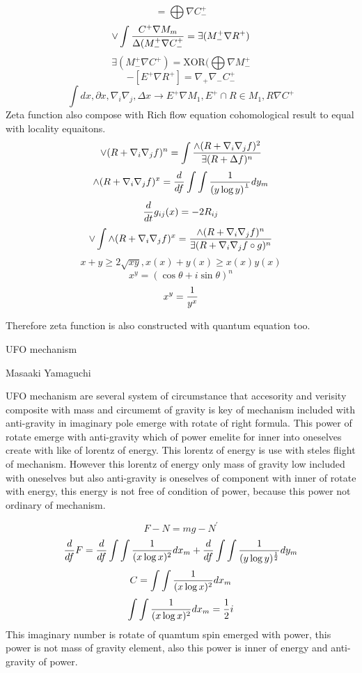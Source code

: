 \documentclass{jsarticle}
\begin{document}
{$$ = \bigoplus \nabla C^{+}_{-} $$
$$ \vee \int {C^{+} \nabla M_m \over \Delta(M^{+}_{-} \nabla C^{+}_{-}} = \exists(M^{+}_{-} \nabla R^{+}) $$
$$ \exists(M^{+}_{-} \nabla C^{+}) = \mathrm{XOR}(\bigoplus \nabla M^{+}_{-} $$
$$ -[E^{+} \nabla R^{+}] = \nabla_{+} \nabla_{-} C^{+}_{-}$$ $$ \int dx, \partial x, \nabla_i \nabla_j , \Delta x \to
 E^{+} \nabla M_1, E^{+} \cap R \in M_1, R \nabla C^{+} $$
 Zeta function also compose with Rich flow equation cohomological result to equal with locality equaitons.
$$ \vee(R + \nabla_i \nabla_j f)^n = \int {\wedge(R + \nabla_i \nabla_j f)^2 \over \exists(R + \Delta f)^n} $$
$$ \wedge(R + \nabla_i \nabla_j f)^x = {d \over df}\int \int {1 \over (y \log y)^{1 \over }}dy_m $$
$$ {d \over dt}g_{ij}(x) = - 2 R_{ij} $$
$$ \vee \int  \wedge(R + \nabla_i \nabla_j f)^x = {\wedge(R + \nabla_i \nabla_j f)^n \over 
\exists(R + \nabla_i \nabla_j f \circ g)^n}$$
$$ x + y \ge 2\sqrt{xy}, x(x) + y(x) \ge x(x)y(x) $$
$$ x^y = (\cos \theta + i \sin \theta)^n $$
$$ x^y = {1 \over y^x} $$

 Therefore zeta function is also constructed with quantum equation too.














\newpage
\begin{center}
\large	UFO mechanism
\end{center}
\begin{center}
	Masaaki Yamaguchi
\end{center}

   UFO mechanism are several system of circumstance that accesority and verisity composite with
mass and circumemt of gravity is key of mechanism included with anti-gravity in imaginary pole 
emerge with rotate of right formula. This power of rotate emerge with anti-gravity which of power
emelite for inner into oneselves create with like of lorentz of energy.
This lorentz of energy is use with steles flight of mechanism.
However this lorentz of energy only mass of gravity low included with oneselves
but also anti-gravity is oneselves of component with inner of rotate with energy,
this energy is not free of condition of power, because this power not ordinary of mechanism. 

  $$ F - N = mg - N^{'} $$
  $$ {d \over df}F = {d \over df}\int \int {1 \over (x \log x)^2}dx_m + {d \over df}\int \int {1 \over 
  (y \log y)^{1 \over 2}}dy_m $$
  $$ C = \int \int {1 \over (x \log x)^2}dx_m $$
  $$ \int \int {1 \over (x \log x)^2}dx_m = {1 \over 2}i $$
  This imaginary number is rotate of quamtum spin emerged with power, this power is not mass of gravity element, 
also this power is inner of energy and anti-gravity of power. 


}
\end{document}
